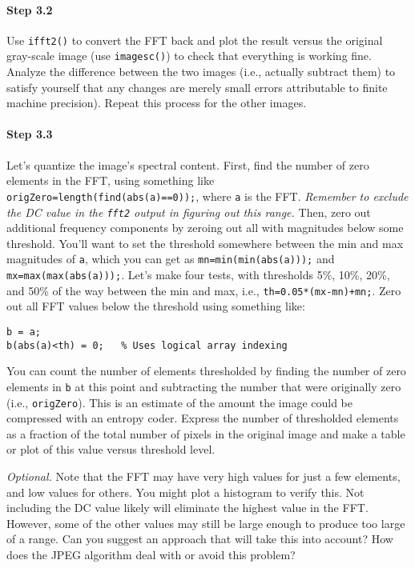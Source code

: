 \paragraph{Step 3.2} Use \verb|ifft2()| to convert the FFT back and
plot the result versus the original gray-scale image (use
\verb|imagesc()|) to check that everything is working fine. Analyze
the difference between the two images (i.e., actually subtract them)
to satisfy yourself that any changes are merely small errors
attributable to finite machine precision). Repeat this process for the
other images.

\paragraph{Step 3.3} Let's quantize the image's spectral
content. First, find the number of zero elements in the FFT, using
something like \verb|origZero=length(find(abs(a)==0));|, where
\verb|a| is the FFT. \emph{Remember to exclude the DC value in the
  \texttt{fft2} output in figuring out this range.} Then, zero out
additional frequency components by zeroing out all with magnitudes
below some threshold. You'll want to set the threshold somewhere
between the min and max magnitudes of \verb|a|, which you can get as
\verb|mn=min(min(abs(a)));| and \verb|mx=max(max(abs(a)));|. Let's
make four tests, with thresholds 5\%, 10\%, 20\%, and 50\% of the way
between the min and max, i.e., \verb|th=0.05*(mx-mn)+mn;|. Zero out
all FFT values below the threshold using something like:
\begin{lstlisting}[style=Matlab-editor,basicstyle=\mlttfamily\small]
b = a;
b(abs(a)<th) = 0;   % Uses logical array indexing
\end{lstlisting}
You can count the number of elements thresholded by finding the number
of zero elements in \verb|b| at this point and subtracting the number
that were originally zero (i.e., \verb|origZero|). This is an estimate
of the amount the image could be compressed with an entropy
coder. Express the number of thresholded elements as a fraction of the
total number of pixels in the original image and make a table or plot
of this value versus threshold level.

\textit{Optional.} Note that the FFT may have very high values for
just a few elements, and low values for others. You might plot a
histogram to verify this. Not including the DC value likely will
eliminate the highest value in the FFT. However, some of the other
values may still be large enough to produce too large of a range. Can
you suggest an approach that will take this into account? How does the
JPEG algorithm deal with or avoid this problem?

